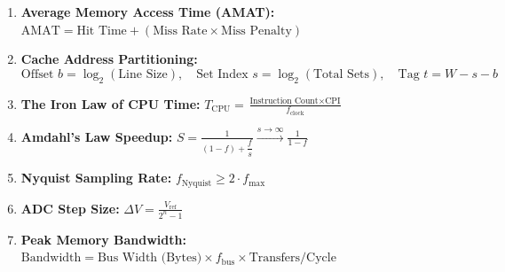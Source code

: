 \begin{enumerate}[label=\bfseries\arabic*.]
    \item \textbf{Average Memory Access Time (AMAT):} $\text{AMAT} = \text{Hit Time} + (\text{Miss Rate} \times \text{Miss Penalty})$
    \item \textbf{Cache Address Partitioning:}
    \[ \text{Offset } b = \log_2(\text{Line Size}), \quad \text{Set Index } s = \log_2(\text{Total Sets}), \quad \text{Tag } t = W - s - b \]
    \item \textbf{The Iron Law of CPU Time:} $T_{\text{CPU}} = \frac{\text{Instruction Count} \times \text{CPI}}{f_{\text{clock}}}$
    \item \textbf{Amdahl's Law Speedup:} $S = \frac{1}{(1 - f) + \dfrac{f}{s}} \xrightarrow{s \to \infty} \frac{1}{1 - f}$
    \item \textbf{Nyquist Sampling Rate:} $f_{\text{Nyquist}} \ge 2 \cdot f_{\text{max}}$
    \item \textbf{ADC Step Size:} $\Delta V = \frac{V_{\text{ref}}}{2^n - 1}$
    \item \textbf{Peak Memory Bandwidth:} $\text{Bandwidth} = \text{Bus Width (Bytes)} \times f_{\text{bus}} \times \text{Transfers/Cycle}$
\end{enumerate}

